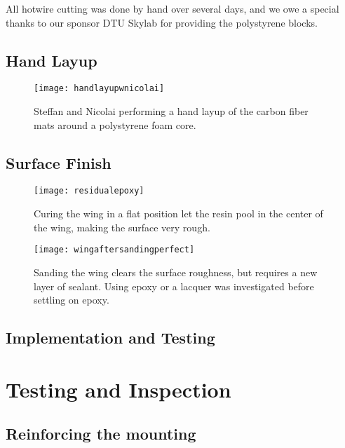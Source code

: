   All hotwire cutting was done by hand over several days, and we owe a special thanks to our sponsor DTU Skylab for providing the polystyrene blocks.



  \subsection{Hand Layup}
    \begin{figure}
      \texttt{[image: handlayupwnicolai]}
      \caption{Steffan and Nicolai performing a hand layup of the carbon fiber mats around a polystyrene foam core.}
      \label{fig:handlayup}
    \end{figure}


  \subsection{Surface Finish}

    \begin{figure}
      \texttt{[image: residualepoxy]}
      \caption{Curing the wing in a flat position let the resin pool in the center of the wing, making the surface very rough.}
      \label{fig:roughsurface}
    \end{figure}

    \begin{figure}
      \texttt{[image: wingaftersandingperfect]}
      \caption{Sanding the wing clears the surface roughness, but requires a new layer of sealant. Using epoxy or a lacquer was investigated before settling on epoxy.}
      \label{fig:wingaftersanding}
    \end{figure}

  \subsection{Implementation and Testing}

\section{Testing and Inspection}

  \subsection{Reinforcing the mounting}
